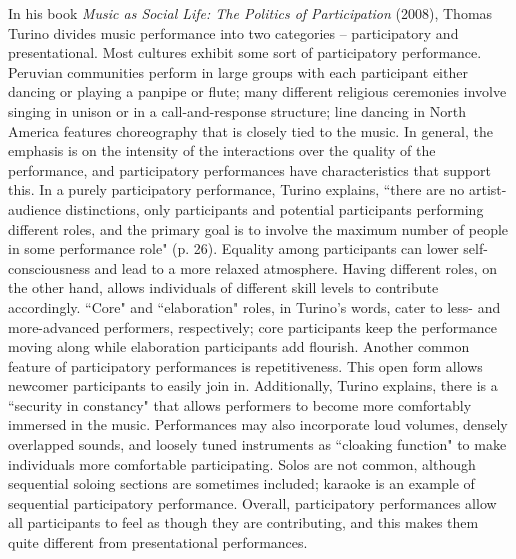 In his book \textit{Music as Social Life: The Politics of Participation} (2008), Thomas Turino divides music performance into two categories -- participatory and presentational. Most cultures exhibit some sort of participatory performance. Peruvian communities perform in large groups with each participant either dancing or playing a panpipe or flute; many different religious ceremonies involve singing in unison or in a call-and-response structure; line dancing in North America features choreography that is closely tied to the music. In general, the emphasis is on the intensity of the interactions over the quality of the performance, and participatory performances have characteristics that support this. In a purely participatory performance, Turino explains, ``there are no artist-audience distinctions, only participants and potential participants performing different roles, and the primary goal is to involve the maximum number of people in some performance role" (p. 26). Equality among participants can lower self-consciousness and lead to a more relaxed atmosphere. Having different roles, on the other hand, allows individuals of different skill levels to contribute accordingly. ``Core" and ``elaboration" roles, in Turino's words, cater to less- and more-advanced performers, respectively; core participants keep the performance moving along while elaboration participants add flourish. Another common feature of participatory performances is repetitiveness. This open form allows newcomer participants to easily join in. Additionally, Turino explains, there is a ``security in constancy" that allows performers to become more comfortably immersed in the music. Performances may also incorporate loud volumes, densely overlapped sounds, and loosely tuned instruments as ``cloaking function" to make individuals more comfortable participating. Solos are not common, although sequential soloing sections are sometimes included; karaoke is an example of sequential participatory performance. Overall, participatory performances allow all participants to feel as though they are contributing, and this makes them quite different from presentational performances.
